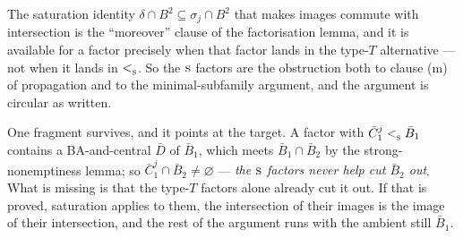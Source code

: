 The saturation identity $\delta\cap B^{2}\subseteq\sigma_{j}\cap B^{2}$ that
makes images commute with intersection is the ``moreover'' clause of the
factorisation lemma, and it is available for a factor precisely when that
factor lands in the type-$T$ alternative --- not when it lands in $<_{\textup{\textsc{s}}}^{}$.
So the $\textup{\textsc{s}}$ factors are the obstruction both to clause (m) of propagation and
to the minimal-subfamily argument, and the argument is circular as written.

One fragment survives, and it points at the target. A factor with
$\bar C_{1}^{j}<_{\textup{\textsc{s}}}^{}\bar B_{1}$ contains a BA-and-central $\bar D$ of
$\bar B_{1}$, which meets $\bar B_{1}\cap\bar B_{2}$ by the strong-nonemptiness
lemma; so $\bar C_{1}^{j}\cap\bar B_{2}\neq\varnothing$ --- \emph{the $\textup{\textsc{s}}$
factors never help cut $\bar B_{2}$ out}. What is missing is that the type-$T$
factors alone already cut it out. If that is proved, saturation applies to
them, the intersection of their images is the image of their intersection, and
the rest of the argument runs with the ambient still $\bar B_{1}$.

